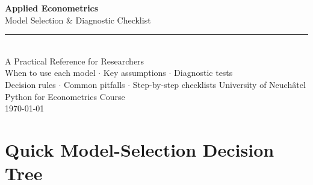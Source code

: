 \documentclass[10pt,a4paper]{article}
\begin{document}

\begin{titlepage}
\pagecolor{NavyBlue}
\color{white}
\vspace*{3cm}
\begin{center}
{\fontsize{28}{34}\selectfont\bfseries\sffamily Applied Econometrics}\\[0.5em]
{\fontsize{18}{24}\selectfont\sffamily Model Selection \& Diagnostic Checklist}\\[1.5em]
\textcolor{MedBlue}{\rule{12cm}{1pt}}\\[1.5em]
{\large\sffamily A Practical Reference for Researchers}\\[0.5em]
{\normalsize\sffamily\color{MedBlue}
When to use each model $\cdot$ Key assumptions $\cdot$ Diagnostic tests\\
Decision rules $\cdot$ Common pitfalls $\cdot$ Step-by-step checklists}
\vfill
{\large\sffamily University of Neuch\^{a}tel}\\[0.3em]
{\normalsize\sffamily\color{MedBlue} Python for Econometrics Course}\\[0.3em]
{\normalsize\sffamily\color{MedBlue} \today}
\end{center}
\end{titlepage}
\nopagecolor

\tableofcontents
\thispagestyle{fancy}
\newpage

\section{Quick Model-Selection Decision Tree}
\end{document}
